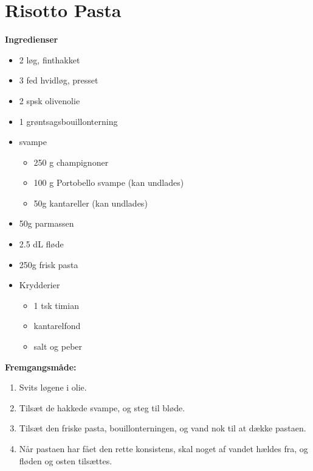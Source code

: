 \documentclass{book}
\begin{document}
\newpage \section{Risotto Pasta}
\begin{minipage}[t]{0.5\textwidth}
\textbf{Ingredienser}
\begin{itemize}
    \item 2 løg, finthakket
    \item 3 fed hvidløg, presset
    \item 2 spsk olivenolie
    \item 1 grøntsagsbouillonterning
    \item svampe
    \begin{itemize}
        \item 250 g champignoner 
        \item 100 g Portobello svampe (kan undlades)
        \item 50g kantareller (kan undlades)
    \end{itemize}
    \item 50g parmassen
    \item 2.5 dL fløde
    \item 250g frisk pasta
    \item Krydderier
    \begin{itemize}
        \item 1 tsk timian
        \item kantarelfond
        \item salt og peber
    \end{itemize}
\end{itemize}
\end{minipage}
\begin{minipage}[t]{0.5\textwidth}
\textbf{Fremgangsmåde:}
\begin{enumerate}
    \item Svits løgene i olie.
    \item Tilsæt de hakkede svampe, og steg til bløde.
    \item Tilsæt den friske pasta, bouillonterningen, og vand nok til at dække pastaen.
    \item Når pastaen har fået den rette konsistens, skal noget af vandet hældes fra, og fløden og osten tilsættes.
\end{enumerate}
\end{minipage}
\end{document}
